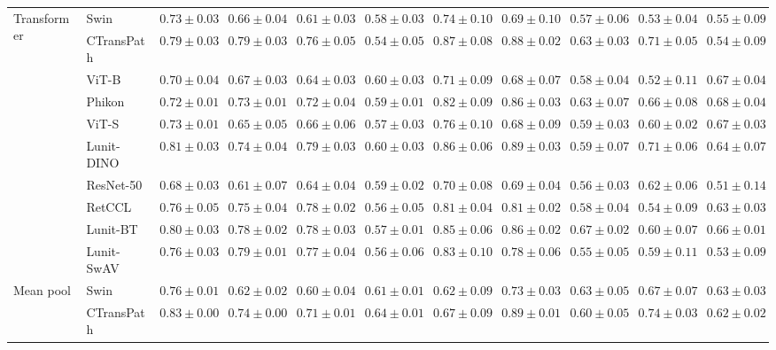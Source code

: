 \begin{tabular}{ll|cccc|c|cccc}
\cline{1-11}
\multirow[t]{10}{*}{Transformer} & Swin & $0.73 \pm 0.03$ & $0.66 \pm 0.04$ & $0.61 \pm 0.03$ & $0.58 \pm 0.03$ & $0.74 \pm 0.10$ & $0.69 \pm 0.10$ & $0.57 \pm 0.06$ & $0.53 \pm 0.04$ & $0.55 \pm 0.09$ \\
 & CTransPath & $0.79 \pm 0.03$ & $\mathbf{0.79 \pm 0.03}$ & $0.76 \pm 0.05$ & $0.54 \pm 0.05$ & $\mathbf{0.87 \pm 0.08}$ & $0.88 \pm 0.02$ & $0.63 \pm 0.03$ & $\mathbf{0.71 \pm 0.05}$ & $0.54 \pm 0.09$ \\
 & ViT-B & $0.70 \pm 0.04$ & $0.67 \pm 0.03$ & $0.64 \pm 0.03$ & $0.60 \pm 0.03$ & $0.71 \pm 0.09$ & $0.68 \pm 0.07$ & $0.58 \pm 0.04$ & $0.52 \pm 0.11$ & $0.67 \pm 0.04$ \\
 & Phikon & $0.72 \pm 0.01$ & $0.73 \pm 0.01$ & $0.72 \pm 0.04$ & $0.59 \pm 0.01$ & $0.82 \pm 0.09$ & $0.86 \pm 0.03$ & $0.63 \pm 0.07$ & $0.66 \pm 0.08$ & $\mathbf{0.68 \pm 0.04}$ \\
 & ViT-S & $0.73 \pm 0.01$ & $0.65 \pm 0.05$ & $0.66 \pm 0.06$ & $0.57 \pm 0.03$ & $0.76 \pm 0.10$ & $0.68 \pm 0.09$ & $0.59 \pm 0.03$ & $0.60 \pm 0.02$ & $0.67 \pm 0.03$ \\
 & Lunit-DINO & $\mathbf{0.81 \pm 0.03}$ & $0.74 \pm 0.04$ & $\mathbf{0.79 \pm 0.03}$ & $\mathbf{0.60 \pm 0.03}$ & $0.86 \pm 0.06$ & $\mathbf{0.89 \pm 0.03}$ & $0.59 \pm 0.07$ & $0.71 \pm 0.06$ & $0.64 \pm 0.07$ \\
 & ResNet-50 & $0.68 \pm 0.03$ & $0.61 \pm 0.07$ & $0.64 \pm 0.04$ & $0.59 \pm 0.02$ & $0.70 \pm 0.08$ & $0.69 \pm 0.04$ & $0.56 \pm 0.03$ & $0.62 \pm 0.06$ & $0.51 \pm 0.14$ \\
 & RetCCL & $0.76 \pm 0.05$ & $0.75 \pm 0.04$ & $0.78 \pm 0.02$ & $0.56 \pm 0.05$ & $0.81 \pm 0.04$ & $0.81 \pm 0.02$ & $0.58 \pm 0.04$ & $0.54 \pm 0.09$ & $0.63 \pm 0.03$ \\
 & Lunit-BT & $0.80 \pm 0.03$ & $0.78 \pm 0.02$ & $0.78 \pm 0.03$ & $0.57 \pm 0.01$ & $0.85 \pm 0.06$ & $0.86 \pm 0.02$ & $\mathbf{0.67 \pm 0.02}$ & $0.60 \pm 0.07$ & $0.66 \pm 0.01$ \\
 & Lunit-SwAV & $0.76 \pm 0.03$ & $0.79 \pm 0.01$ & $0.77 \pm 0.04$ & $0.56 \pm 0.06$ & $0.83 \pm 0.10$ & $0.78 \pm 0.06$ & $0.55 \pm 0.05$ & $0.59 \pm 0.11$ & $0.53 \pm 0.09$ \\
\cline{1-11}
\multirow[t]{10}{*}{Mean pool} & Swin & $0.76 \pm 0.01$ & $0.62 \pm 0.02$ & $0.60 \pm 0.04$ & $0.61 \pm 0.01$ & $0.62 \pm 0.09$ & $0.73 \pm 0.03$ & $0.63 \pm 0.05$ & $0.67 \pm 0.07$ & $0.63 \pm 0.03$ \\
 & CTransPath & $\mathbf{0.83 \pm 0.00}$ & $0.74 \pm 0.00$ & $0.71 \pm 0.01$ & $\mathbf{0.64 \pm 0.01}$ & $0.67 \pm 0.09$ & $0.89 \pm 0.01$ & $0.60 \pm 0.05$ & $0.74 \pm 0.03$ & $0.62 \pm 0.02$ \\

\end{tabular}
